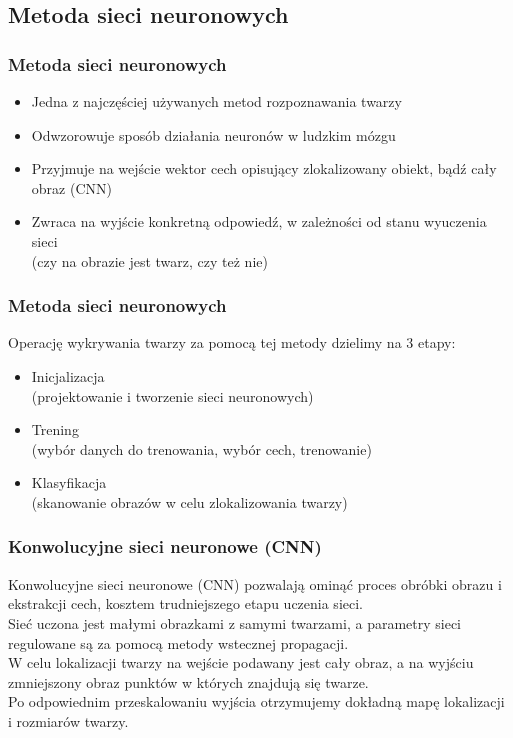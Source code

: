 \documentclass[xcolor=table]{beamer}
\begin{document}
\subsection{Metoda sieci neuronowych}
\begin{frame}
  \frametitle{Metoda sieci neuronowych}

\begin{itemize}
\item Jedna z najczęściej używanych metod rozpoznawania twarzy
\item Odwzorowuje sposób działania neuronów w ludzkim mózgu
\item Przyjmuje na wejście wektor cech opisujący zlokalizowany obiekt, bądź cały obraz (CNN)
\item Zwraca na wyjście konkretną odpowiedź, w zależności od stanu wyuczenia sieci\\ (czy na obrazie jest twarz, czy też nie)
\end{itemize}

\end{frame}

\begin{frame}
  \frametitle{Metoda sieci neuronowych}

Operację wykrywania twarzy za pomocą tej metody dzielimy na 3 etapy:
\begin{itemize}
\item Inicjalizacja\\ (projektowanie i tworzenie sieci neuronowych)
\item Trening\\ (wybór danych do trenowania, wybór cech, trenowanie)
\item Klasyfikacja\\ (skanowanie obrazów w celu zlokalizowania twarzy)
\end{itemize}

\end{frame}

\begin{frame}
  \frametitle{Konwolucyjne sieci neuronowe (CNN)}

 {
Konwolucyjne sieci neuronowe (CNN) pozwalają ominąć proces obróbki obrazu i ekstrakcji cech, kosztem trudniejszego etapu uczenia sieci.\\[\baselineskip]
}
 {
Sieć uczona jest małymi obrazkami z samymi twarzami, a parametry sieci regulowane są za pomocą metody wstecznej propagacji.\\[\baselineskip]
}
 {
W celu lokalizacji twarzy na wejście podawany jest cały obraz, a na wyjściu zmniejszony obraz punktów w których znajdują się twarze.\\[\baselineskip]
}
 {
Po odpowiednim przeskalowaniu wyjścia otrzymujemy dokładną mapę lokalizacji i rozmiarów twarzy.
}
\end{frame}
\end{document}
